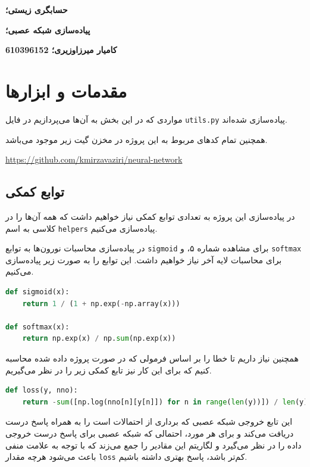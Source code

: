 \documentclass[a4paper, 12pt]{article}
\theoremstyle{definition}
\begin{document}
\textbf{حسابگری زیستی؛}

\textbf{پیاده‌سازی شبکه عصبی؛}

\textbf{کامیار میرزاوزیری؛ 610396152}

\hrulefill

\tableofcontents

\newpage

\section{مقدمات و ابزارها}

مواردی که در این بخش به آن‌ها می‌پردازیم در فایل
\texttt{utils.py}
پیاده‌سازی شده‌اند.

همچنین تمام کدهای مربوط به این پروژه در مخزن گیت زیر موجود می‌باشد.

\begin{center}
    \url{https://github.com/kmirzavaziri/neural-network}
\end{center}

\subsection{توابع کمکی}
در پیاده‌سازی این پروژه به تعدادی توابع کمکی نیاز خواهیم داشت که همه آن‌ها را در کلاسی به اسم
\texttt{helpers}
پیاده‌سازی می‌کنیم.

در پیاده‌سازی محاسبات نورون‌ها به توابع
\texttt{sigmoid}
برای مشاهده شماره ۵، و
\texttt{softmax}
برای محاسبات لایه آخر
نیاز خواهیم داشت. این توابع را به صورت زیر پیاده‌سازی می‌کنیم.

\LTR
\begin{lstlisting}[language=Python]
def sigmoid(x):
    return 1 / (1 + np.exp(-np.array(x)))

def softmax(x):
    return np.exp(x) / np.sum(np.exp(x))
\end{lstlisting}
\RTL

همچنین نیاز داریم تا خطا را بر اساس فرمولی که در صورت پروژه داده شده محاسبه کنیم که برای این کار نیز تابع کمکی زیر را در نظر می‌گیریم.

\LTR
\begin{lstlisting}[language=Python]
def loss(y, nno):
    return -sum([np.log(nno[n][y[n]]) for n in range(len(y))]) / len(y)
\end{lstlisting}
\RTL

این تابع خروجی شبکه عصبی که برداری از احتمالات است را به همراه پاسخ درست دریافت می‌کند و برای هر مورد، احتمالی که شبکه عصبی برای پاسخ درست خروجی داده را در نظر می‌گیرد و لگاریتم این مقادیر را جمع می‌زند که با توجه به علامت منفی باعث می‌شود هرچه مقدار
\texttt{loss}
کم‌تر باشد، پاسخ بهتری داشته باشیم.
\end{document}

